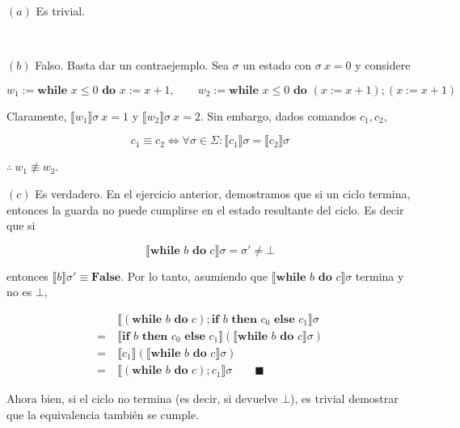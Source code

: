 \documentclass[article, 12pt]{article}
\begin{document}
$(a)$ Es trivial.

~ 

$(b)$ Falso. Basta dar un contraejemplo. Sea $\sigma$ un estado con $\sigma ~ x
= 0$ y considere 

\begin{equation*}
  w_1 := \textbf{while } x \leq 0 \textbf{ do } x := x + 1, \qquad w_2 :=
  \textbf{while } x \leq 0 \textbf{ do } ( x := x + 1 );(x := x + 1)
\end{equation*}

Claramente, $\llbracket w_1 \rrbracket\sigma ~ x = 1$ y $\llbracket w_2
\rrbracket\sigma ~ x = 2$. Sin embargo, dados comandos $c_1,c_2$,

\begin{equation*}
  c_1 \equiv c_2 \iff \forall \sigma \in \Sigma: \llbracket c_1 \rrbracket\sigma = \llbracket c_2
  \rrbracket\sigma
\end{equation*}

$\therefore ~ w_1 \not\equiv w_2$. 

$(c)$ Es verdadero. En el ejercicio anterior, demostramos que si un ciclo termina, entonces la
guarda no puede cumplirse en el estado resultante del ciclo. Es decir que si 

\begin{equation*}
  \llbracket \textbf{while } b \textbf{ do } c \rrbracket\sigma = \sigma' \neq
  \bot 
\end{equation*}

entonces $\llbracket b \rrbracket \sigma' \equiv
\textbf{False}$. Por lo tanto, asumiendo que $\llbracket \textbf{while } b
\textbf{ do } c \rrbracket\sigma$ termina y no es $\bot $,

\begin{align*}
  &\llbracket ( \textbf{while } b \textbf{ do } c );\textbf{if } b \textbf{ then
  } c_0 \textbf{ else } c_1 \rrbracket\sigma \\ 
  =~&\llbracket \textbf{if } b \textbf{ then } c_0 \textbf{ else } c_1
  \rrbracket\left( \llbracket \textbf{while } b \textbf{ do } c \rrbracket\sigma
  \right) \\ 
  =~&\llbracket c_1 \rrbracket \left( \llbracket \textbf{while } b \textbf{ do }
   c \rrbracket\sigma \right)  \\ 
  = ~ &\llbracket ( \textbf{while } b \textbf{ do } c );c_1 \rrbracket\sigma \qquad
  \blacksquare
\end{align*}

Ahora bien, si el ciclo no termina (es decir, si devuelve $\bot$), es trivial
demostrar que la equivalencia también se cumple.
\end{document}
